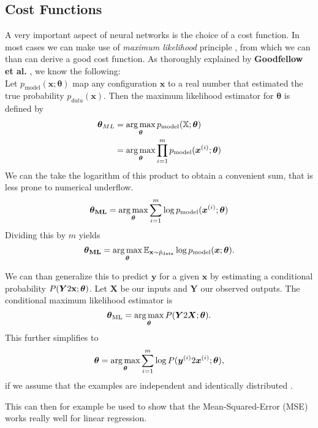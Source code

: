 \subsection{Cost Functions}
\label{sec:cost-functions}

A very important aspect of neural networks is the choice of a cost function.
In most cases we can make use of \emph{maximum likelihood} principle \cite{Cramer:444796}, from which we can than can derive a good cost function.
As thoroughly explained by \textbf{Goodfellow et al.} \cite{Goodfellow-et-al-2016}, we know the following: \\

Let \(p_{\text{model}}(\boldsymbol{x}; \boldsymbol{\theta})\) map any configuration \(\boldsymbol{x}\) to a real number that estimated the true probability \(p_{data}(\boldsymbol{x})\).
Then the maximum likelihood estimator for \(\boldsymbol{\theta}\) is defined by
\begin{align}
    \boldsymbol{\theta}_{ML} &= \operatorname*{arg\,max}_{\boldsymbol{\theta}} p_{\text{model}} (\mathbb{X}; \boldsymbol{\theta}) \\
    &= \operatorname*{arg\,max}_{\boldsymbol{\theta}} \prod^{m}_{i = 1} p_{\text{model}} (\boldsymbol{x}^{(i)}; \boldsymbol{\theta})
\end{align}
We can the take the logarithm of this product to obtain a convenient sum, that is less prone to numerical underflow.
\begin{equation}
    \boldsymbol{\theta}_{\textbf{ML}} = \operatorname*{arg\,max}_{\boldsymbol{\theta}} \sum^{m}_{i = 1} \log p_{\text{model}} (\boldsymbol{x}^{(i)}; \boldsymbol{\theta})
\end{equation}
Dividing this by \(m\) yields
\begin{equation}
    \boldsymbol{\theta}_{\textbf{ML}} = \operatorname*{arg\,max}_{\boldsymbol{\theta}} \mathbb{E}_{\mathbf{x} \sim \hat{p}_{\text{data}}} \log p_{\text{model}} (\boldsymbol{x}; \boldsymbol{\theta}).
\end{equation}

We can than generalize this to predict \(\boldsymbol{y}\) for a given \(\boldsymbol{x}\) by estimating a conditional probability \(P(\boldsymbol{Y} 2 \mathbf{x}; \boldsymbol{\theta})\).
Let \(\boldsymbol{X}\) be our inputs and \(\boldsymbol{Y}\) our observed outputs.
The conditional maximum likelihood estimator is
\begin{equation}
    \boldsymbol{\theta}_{\text{ML}} = \operatorname*{arg\,max}_{\boldsymbol{\theta}} P (\boldsymbol{Y} 2 \boldsymbol{X}; \boldsymbol{\theta}).
\end{equation}
This further simplifies to
\begin{equation}
    \boldsymbol{\theta} = \operatorname*{arg\,max}_{\boldsymbol{\theta}} \sum^{m}_{i = 1} \log P (\boldsymbol{y}^{(i)} 2 \boldsymbol{x}^{(i)}; \boldsymbol{\theta}),
\end{equation}
if we assume that the examples are independent and identically distributed .

This can then for example be used to show that the Mean-Squared-Error (MSE) works really well for linear regression.

